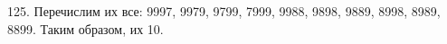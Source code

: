 125. Перечислим их все: 9997, 9979, 9799, 7999, 9988, 9898, 9889, 8998, 8989, 8899. Таким образом, их 10.\\
